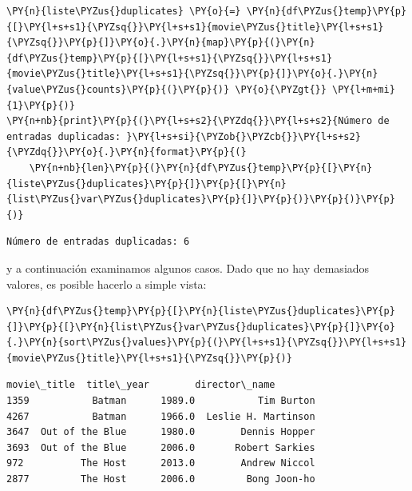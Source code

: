     \begin{tcolorbox}[breakable, size=fbox, boxrule=1pt, pad at break*=1mm,colback=cellbackground, colframe=cellborder]
\begin{Verbatim}[commandchars=\\\{\}]
\PY{n}{liste\PYZus{}duplicates} \PY{o}{=} \PY{n}{df\PYZus{}temp}\PY{p}{[}\PY{l+s+s1}{\PYZsq{}}\PY{l+s+s1}{movie\PYZus{}title}\PY{l+s+s1}{\PYZsq{}}\PY{p}{]}\PY{o}{.}\PY{n}{map}\PY{p}{(}\PY{n}{df\PYZus{}temp}\PY{p}{[}\PY{l+s+s1}{\PYZsq{}}\PY{l+s+s1}{movie\PYZus{}title}\PY{l+s+s1}{\PYZsq{}}\PY{p}{]}\PY{o}{.}\PY{n}{value\PYZus{}counts}\PY{p}{(}\PY{p}{)} \PY{o}{\PYZgt{}} \PY{l+m+mi}{1}\PY{p}{)}
\PY{n+nb}{print}\PY{p}{(}\PY{l+s+s2}{\PYZdq{}}\PY{l+s+s2}{Número de entradas duplicadas: }\PY{l+s+si}{\PYZob{}\PYZcb{}}\PY{l+s+s2}{\PYZdq{}}\PY{o}{.}\PY{n}{format}\PY{p}{(}
    \PY{n+nb}{len}\PY{p}{(}\PY{n}{df\PYZus{}temp}\PY{p}{[}\PY{n}{liste\PYZus{}duplicates}\PY{p}{]}\PY{p}{[}\PY{n}{list\PYZus{}var\PYZus{}duplicates}\PY{p}{]}\PY{p}{)}\PY{p}{)}\PY{p}{)}
\end{Verbatim}
\end{tcolorbox}

    \begin{Verbatim}[commandchars=\\\{\}]
Número de entradas duplicadas: 6
\end{Verbatim}

    y a continuación examinamos algunos casos. Dado que no hay demasiados
valores, es posible hacerlo a simple vista:

    \begin{tcolorbox}[breakable, size=fbox, boxrule=1pt, pad at break*=1mm,colback=cellbackground, colframe=cellborder]
\begin{Verbatim}[commandchars=\\\{\}]
\PY{n}{df\PYZus{}temp}\PY{p}{[}\PY{n}{liste\PYZus{}duplicates}\PY{p}{]}\PY{p}{[}\PY{n}{list\PYZus{}var\PYZus{}duplicates}\PY{p}{]}\PY{o}{.}\PY{n}{sort\PYZus{}values}\PY{p}{(}\PY{l+s+s1}{\PYZsq{}}\PY{l+s+s1}{movie\PYZus{}title}\PY{l+s+s1}{\PYZsq{}}\PY{p}{)}
\end{Verbatim}
\end{tcolorbox}

            \begin{tcolorbox}[breakable, boxrule=.5pt, size=fbox, pad at break*=1mm, opacityfill=0]
\begin{Verbatim}[commandchars=\\\{\}]
          movie\_title  title\_year        director\_name
1359           Batman      1989.0           Tim Burton
4267           Batman      1966.0  Leslie H. Martinson
3647  Out of the Blue      1980.0        Dennis Hopper
3693  Out of the Blue      2006.0       Robert Sarkies
972          The Host      2013.0        Andrew Niccol
2877         The Host      2006.0         Bong Joon-ho
\end{Verbatim}
\end{tcolorbox}
        
